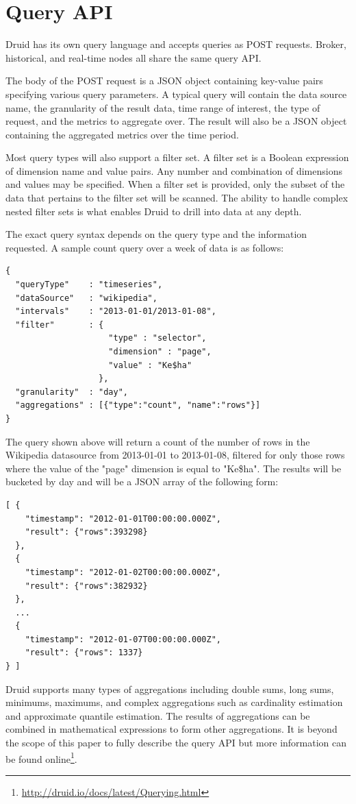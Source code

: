 \documentclass{acm_proc_article-sp}
\begin{document}
\section{Query API}
\label{sec:query-api}
Druid has its own query language and accepts queries as POST requests. Broker,
historical, and real-time nodes all share the same query API.

The body of the POST request is a JSON object containing key-value pairs
specifying various query parameters. A typical query will contain the data
source name, the granularity of the result data, time range of interest, the
type of request, and the metrics to aggregate over. The result will also be a
JSON object containing the aggregated metrics over the time period.

Most query types will also support a filter set. A filter set is a Boolean
expression of dimension name and value pairs. Any number and combination of
dimensions and values may be specified.  When a filter set is provided, only
the subset of the data that pertains to the filter set will be scanned.  The
ability to handle complex nested filter sets is what enables Druid to drill
into data at any depth.

The exact query syntax depends on the query type and the information requested.
A sample count query over a week of data is as follows:
{\scriptsize\begin{verbatim}
{
  "queryType"    : "timeseries",
  "dataSource"   : "wikipedia",
  "intervals"    : "2013-01-01/2013-01-08",
  "filter"       : {
                     "type" : "selector",
                     "dimension" : "page",
                     "value" : "Ke$ha"
                   },
  "granularity"  : "day",
  "aggregations" : [{"type":"count", "name":"rows"}]
}
\end{verbatim}}
The query shown above will return a count of the number of rows in the Wikipedia datasource
from 2013-01-01 to 2013-01-08, filtered for only those rows where the value of the "page" dimension is 
equal to "Ke\$ha". The results will be bucketed by day and will be a JSON array of the following form:
{\scriptsize\begin{verbatim}
[ {
    "timestamp": "2012-01-01T00:00:00.000Z",
    "result": {"rows":393298}
  },
  {
    "timestamp": "2012-01-02T00:00:00.000Z",
    "result": {"rows":382932}
  },
  ...
  {
    "timestamp": "2012-01-07T00:00:00.000Z",
    "result": {"rows": 1337}
} ]
\end{verbatim}}

Druid supports many types of aggregations including double sums, long sums,
minimums, maximums, and complex aggregations such as cardinality estimation and
approximate quantile estimation.  The results of aggregations can be combined
in mathematical expressions to form other aggregations. It is beyond the scope
of this paper to fully describe the query API but more information can be found
online\footnote{\href{http://druid.io/docs/latest/Querying.html}{http://druid.io/docs/latest/Querying.html}}.
\end{document}
